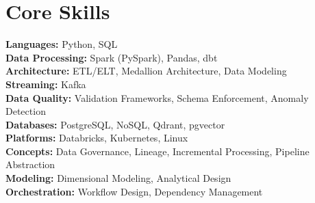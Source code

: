 \section*{Core Skills}
\vspace{-0.5em}

\textbf{Languages:} Python, SQL \\
\textbf{Data Processing:} Spark (PySpark), Pandas, dbt \\
\textbf{Architecture:} ETL/ELT, Medallion Architecture, Data Modeling \\
\textbf{Streaming:} Kafka \\
\textbf{Data Quality:} Validation Frameworks, Schema Enforcement, Anomaly Detection \\
\textbf{Databases:} PostgreSQL, NoSQL, Qdrant, pgvector \\
\textbf{Platforms:} Databricks, Kubernetes, Linux \\
\textbf{Concepts:} Data Governance, Lineage, Incremental Processing, Pipeline Abstraction \\
\textbf{Modeling:} Dimensional Modeling, Analytical Design \\
\textbf{Orchestration:} Workflow Design, Dependency Management